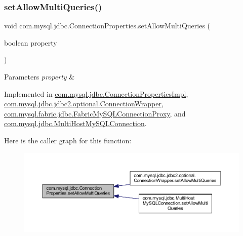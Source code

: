 \subsubsection{\texorpdfstring{set\+Allow\+Multi\+Queries()}{setAllowMultiQueries()}}
{\footnotesize\ttfamily void com.\+mysql.\+jdbc.\+Connection\+Properties.\+set\+Allow\+Multi\+Queries (\begin{DoxyParamCaption}\item[{boolean}]{property }\end{DoxyParamCaption})}


\begin{DoxyParams}{Parameters}
{\em property} & \\
\hline
\end{DoxyParams}


Implemented in \mbox{\hyperlink{classcom_1_1mysql_1_1jdbc_1_1_connection_properties_impl_aa805cde72f5aa791da69e67346678199}{com.\+mysql.\+jdbc.\+Connection\+Properties\+Impl}}, \mbox{\hyperlink{classcom_1_1mysql_1_1jdbc_1_1jdbc2_1_1optional_1_1_connection_wrapper_a4a74a98581dab1e4f5bd0dde12c2ab23}{com.\+mysql.\+jdbc.\+jdbc2.\+optional.\+Connection\+Wrapper}}, \mbox{\hyperlink{classcom_1_1mysql_1_1fabric_1_1jdbc_1_1_fabric_my_s_q_l_connection_proxy_a8a173d9a56b4ff007f6d853cc53a840f}{com.\+mysql.\+fabric.\+jdbc.\+Fabric\+My\+S\+Q\+L\+Connection\+Proxy}}, and \mbox{\hyperlink{classcom_1_1mysql_1_1jdbc_1_1_multi_host_my_s_q_l_connection_a0a2fefd00cc98baf06444ff815a8066d}{com.\+mysql.\+jdbc.\+Multi\+Host\+My\+S\+Q\+L\+Connection}}.

Here is the caller graph for this function\+:\nopagebreak
\begin{figure}[H]
\begin{center}
\leavevmode
\includegraphics[width=350pt]{interfacecom_1_1mysql_1_1jdbc_1_1_connection_properties_ac1ed5c3bc5f7f6c977f499b6560ef5a4_icgraph}
\end{center}
\end{figure}
\mbox{\label{interfacecom_1_1mysql_1_1jdbc_1_1_connection_properties_aed2f8233f5faee7186e807c4f737b12d}} 
